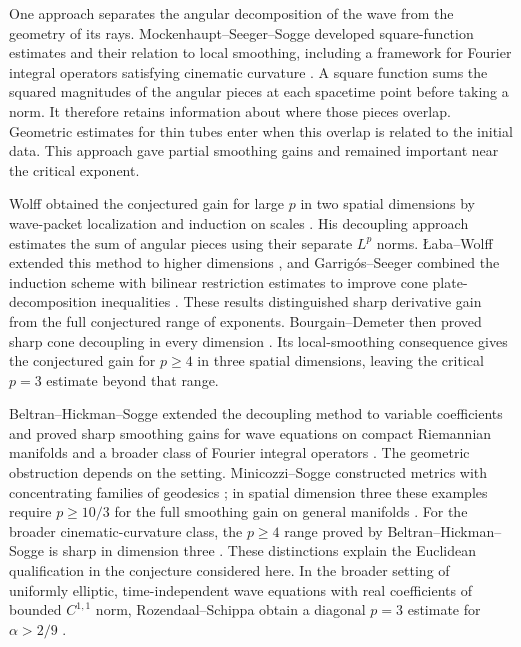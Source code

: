 One approach separates the angular decomposition of the wave from the
geometry of its rays. Mockenhaupt--Seeger--Sogge developed square-function
estimates and their relation to local smoothing, including a framework
for Fourier integral operators satisfying cinematic curvature
\cite{MockenhauptSeegerSogge1992,MockenhauptSeegerSogge1993}.
A square function sums the squared magnitudes of the angular pieces at
each spacetime point before taking a norm. It therefore retains
information about where those pieces overlap. Geometric estimates for
thin tubes enter when this overlap is related to the initial data.
This approach gave partial smoothing gains and remained important
near the critical exponent.

Wolff obtained the conjectured gain for large $p$ in two spatial
dimensions by wave-packet localization and induction on scales
\cite{Wolff2000}. His decoupling approach estimates the sum of angular
pieces using their separate $L^p$ norms. {\L}aba--Wolff extended this
method to higher dimensions \cite{LabaWolff2002}, and
Garrig\'os--Seeger combined the induction scheme with bilinear
restriction estimates to improve cone plate-decomposition inequalities
\cite{GarrigosSeeger2009}. These results distinguished sharp derivative
gain from the full conjectured range of exponents. Bourgain--Demeter
then proved sharp cone decoupling in every dimension
\cite[Theorem~1.2]{BourgainDemeter2015}. Its local-smoothing consequence
gives the conjectured gain for $p\ge4$ in three spatial dimensions,
leaving the critical $p=3$ estimate beyond that range.

Beltran--Hickman--Sogge extended the decoupling method to variable
coefficients and proved sharp smoothing gains for wave equations on
compact Riemannian manifolds and a broader class of Fourier integral
operators \cite{BeltranHickmanSogge2020}. The geometric obstruction
depends on the setting. Minicozzi--Sogge constructed metrics with
concentrating families of geodesics \cite{MinicozziSogge1997}; in
spatial dimension three these examples require $p\ge10/3$ for the
full smoothing gain on general manifolds
\cite[Section~1.1]{BeltranHickmanSogge2020}. For the broader
cinematic-curvature class, the $p\ge4$ range proved by
Beltran--Hickman--Sogge is sharp in dimension three
\cite[Theorem~1.2 and Proposition~1.3]{BeltranHickmanSogge2020}.
These distinctions explain the Euclidean qualification in the
conjecture considered here.
In the broader setting of uniformly elliptic, time-independent wave
equations with real coefficients of bounded $C^{1,1}$ norm,
Rozendaal--Schippa obtain a diagonal $p=3$ estimate for $\alpha>2/9$
\cite[Corollary~1.2]{RozendaalSchippa2026}.

